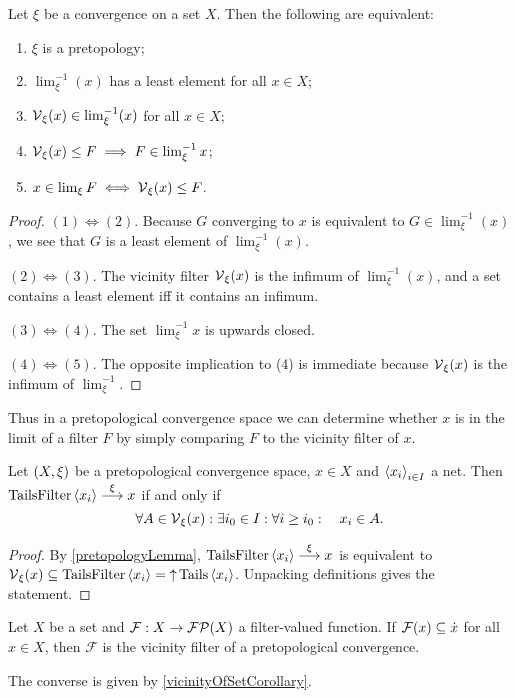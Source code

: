 \begin{lemma} \label{pretopologyLemma}
Let $\xi$ be a convergence on a set $X$. Then the following are equivalent:
\begin{enumerate}
\item $\xi$ is a pretopology;
\item $\lim_\xi^{-1}(x)$ has a least element for all $x\in X$;
\item $\operatorname{\mathcal{V}}_\xi(x) \in \lim_\xi^{-1}(x)$ for all $x\in X$;
\item $\operatorname{\mathcal{V}}_\xi(x) \leq F \implies F\in\lim^{-1}_\xi x$;
\item $x\in\lim_\xi F \iff \operatorname{\mathcal{V}}_\xi(x) \leq F$.
\end{enumerate}
\end{lemma}
\begin{proof}
$(1) \Leftrightarrow (2)$. Because $G$ converging to $x$ is equivalent to $G\in \lim_\xi^{-1}(x)$, we see that $G$ is a least element of $\lim_\xi^{-1}(x)$.

$(2) \Leftrightarrow (3)$. The vicinity filter $\operatorname{\mathcal{V}}_\xi(x)$ is the infimum of $\lim_\xi^{-1}(x)$, and a set contains a least element iff it contains an infimum.

$(3) \Leftrightarrow (4)$. The set $\lim^{-1}_\xi x$ is upwards closed.

$(4) \Leftrightarrow (5)$. The opposite implication to (4) is immediate because $\operatorname{\mathcal{V}}_\xi(x)$ is the infimum of $\lim^{-1}_\xi$.
\end{proof}
Thus in a pretopological convergence space we can determine whether $x$ is in the limit of a filter $F$ by simply comparing $F$ to the vicinity filter of $x$.

\begin{lemma} \label{pretopologicalNetConvergence}
Let $\sSet{X,\xi}$ be a pretopological convergence space, $x\in X$ and $\left\langle x_i \right\rangle_{i\in I}$ a net. Then $\operatorname{TailsFilter}\left\langle x_i \right\rangle \overset{\xi}{\longrightarrow} x$ \textup{if and only if}
\[ \forall A\in \operatorname{\mathcal{V}}_\xi(x): \exists i_0\in I: \forall i \geq i_0: \quad x_i\in A. \]
\end{lemma}
\begin{proof}
By \ref{pretopologyLemma}, $\operatorname{TailsFilter}\left\langle x_i \right\rangle \overset{\xi}{\longrightarrow} x$ is equivalent to $\operatorname{\mathcal{V}}_\xi(x) \subseteq \operatorname{TailsFilter}\left\langle x_i \right\rangle = \operatorname{\uparrow} \operatorname{Tails}\left\langle x_i \right\rangle$. Unpacking definitions gives the statement.
\end{proof}

\begin{lemma} \label{filterFunctionToPretopology}
Let $X$ be a set and $\mathcal{F}:X\to \operatorname{\mathcal{FP}}(X)$ a filter-valued function. If $\mathcal{F}(x) \subseteq \dot{x}$ for all $x\in X$, then $\mathcal{F}$ is the vicinity filter of a pretopological convergence.
\end{lemma}
The converse is given by \ref{vicinityOfSetCorollary}.

